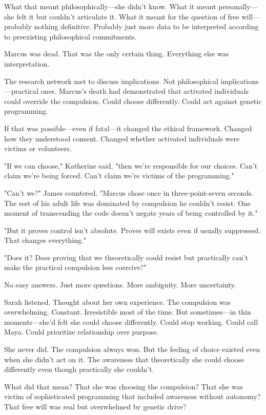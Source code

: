 What that meant philosophically—she didn't know. What it meant personally—she felt it but couldn't articulate it. What it meant for the question of free will—probably nothing definitive. Probably just more data to be interpreted according to preexisting philosophical commitments.

Marcus was dead. That was the only certain thing. Everything else was interpretation.

\scenebreak

The research network met to discuss implications. Not philosophical implications—practical ones. Marcus's death had demonstrated that activated individuals could override the compulsion. Could choose differently. Could act against genetic programming.

If that was possible—even if fatal—it changed the ethical framework. Changed how they understood consent. Changed whether activated individuals were victims or volunteers.

"If we can choose," Katherine said, "then we're responsible for our choices. Can't claim we're being forced. Can't claim we're victims of the programming."

"Can't we?" James countered. "Marcus chose once in three-point-seven seconds. The rest of his adult life was dominated by compulsion he couldn't resist. One moment of transcending the code doesn't negate years of being controlled by it."

"But it proves control isn't absolute. Proves will exists even if usually suppressed. That changes everything."

"Does it? Does proving that we theoretically could resist but practically can't make the practical compulsion less coercive?"

No easy answers. Just more questions. More ambiguity. More uncertainty.

Sarah listened. Thought about her own experience. The compulsion was overwhelming. Constant. Irresistible most of the time. But sometimes—in thin moments—she'd felt she could choose differently. Could stop working. Could call Maya. Could prioritize relationship over purpose.

She never did. The compulsion always won. But the feeling of choice existed even when she didn't act on it. The awareness that theoretically she could choose differently even though practically she couldn't.

What did that mean? That she was choosing the compulsion? That she was victim of sophisticated programming that included awareness without autonomy? That free will was real but overwhelmed by genetic drive?

